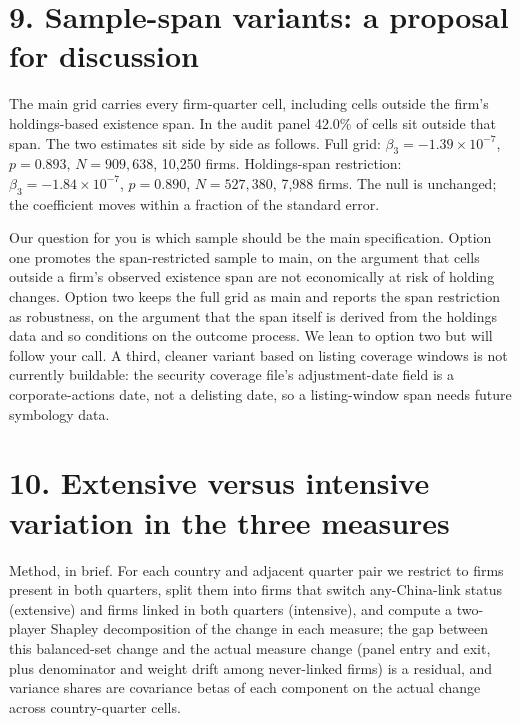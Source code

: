 \documentclass[11pt]{article}
\begin{document}
\section*{9. Sample-span variants: a proposal for discussion}

The main grid carries every firm-quarter cell, including cells outside the
firm's holdings-based existence span. In the audit panel 42.0\% of cells sit
outside that span. The two estimates sit side by side as follows. Full grid:
$\beta_3 = -1.39\times10^{-7}$, $p = 0.893$, $N = 909{,}638$, 10,250 firms.
Holdings-span restriction: $\beta_3 = -1.84\times10^{-7}$, $p = 0.890$,
$N = 527{,}380$, 7,988 firms. The null is unchanged; the coefficient moves
within a fraction of the standard error.

Our question for you is which sample should be the main specification. Option
one promotes the span-restricted sample to main, on the argument that cells
outside a firm's observed existence span are not economically at risk of
holding changes. Option two keeps the full grid as main and reports the span
restriction as robustness, on the argument that the span itself is derived
from the holdings data and so conditions on the outcome process. We lean to
option two but will follow your call. A third, cleaner variant based on
listing coverage windows is not currently buildable: the security coverage
file's adjustment-date field is a corporate-actions date, not a delisting
date, so a listing-window span needs future symbology data.

\section*{10. Extensive versus intensive variation in the three measures}

Method, in brief. For each country and adjacent quarter pair we restrict to
firms present in both quarters, split them into firms that switch
any-China-link status (extensive) and firms linked in both quarters
(intensive), and compute a two-player Shapley decomposition of the change in
each measure; the gap between this balanced-set change and the actual measure
change (panel entry and exit, plus denominator and weight drift among
never-linked firms) is a residual, and variance shares are covariance betas of
each component on the actual change across country-quarter cells.
\end{document}
